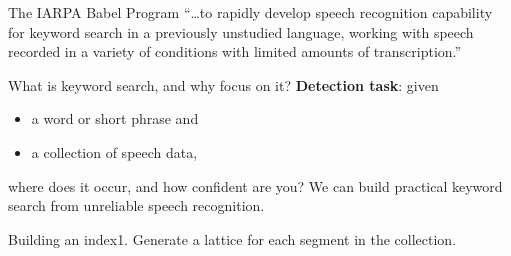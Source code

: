 \begin{frame}{The IARPA Babel Program}{}
  \Large{``\ldots to rapidly develop speech recognition
    capability for \alert{keyword search} in a previously unstudied
    language, working with speech recorded in a variety of
    conditions with limited amounts of transcription.''}\par
\end{frame}

\begin{frame}{What is keyword search, and why focus on it?}{}
  {\bf Detection task}: given
    \begin{itemize}
    \item a word or short phrase and
    \item a collection of speech data,
    \end{itemize}
    \alert{where} does it occur, and \alert{how confident} are you?
    \vfill
    We can build \alert{practical} keyword search from
    \alert{unreliable} speech recognition.
\end{frame}

\begin{frame}{Building an index}{1. Generate a lattice for each segment in the collection.}
  
\end{frame}





